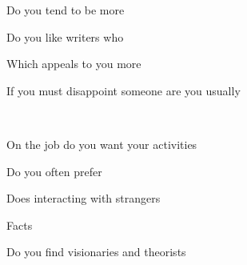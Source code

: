 \documentclass[english,pdf,pagemark,stamp,globalid=\candidateID,oneside]{sdaps}
\begin{document}
\begin{questionnaire}
\begin{multicols}{2}
\begin{choicequestion}[2]{Do you tend to be more}
\end{choicequestion}

\begin{choicequestion}[2]{Do you like writers who}
\end{choicequestion}

\begin{choicequestion}[2]{Which appeals to you more}
\end{choicequestion}

\begin{choicequestion}[2]{If you must disappoint someone are you usually}
\end{choicequestion}
\\
\begin{choicequestion}[2]{On the job do you want your activities}
\end{choicequestion}

\begin{choicequestion}[2]{Do you often prefer}
\end{choicequestion}

\begin{choicequestion}[2]{Does interacting with strangers}
\end{choicequestion}

\begin{choicequestion}[2]{Facts}
\end{choicequestion}

\begin{choicequestion}[2]{Do you find visionaries and theorists}
\end{choicequestion}


\end{multicols}
\end{questionnaire}
\end{document}
